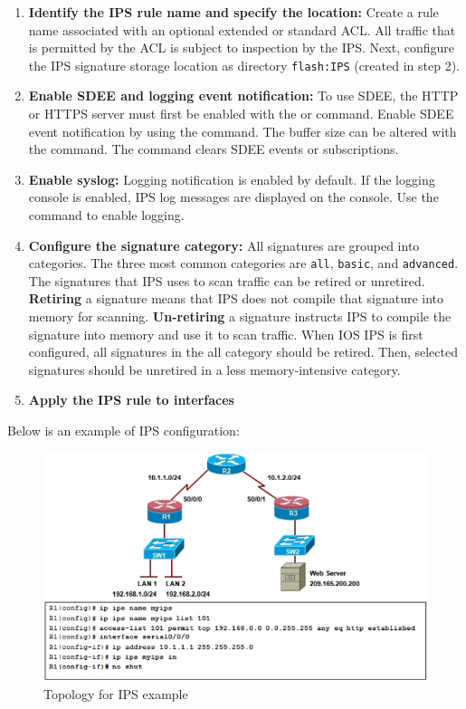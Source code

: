 \begin{enumerate}
\item \textbf{Identify the IPS rule name and specify the location:} Create a rule name associated with an optional extended or standard ACL. All traffic that is permitted by the ACL is subject to inspection by the IPS. Next, configure the IPS signature storage location as directory \verb|flash:IPS| (created in step 2).

\item \textbf{Enable SDEE and logging event notification:} To use SDEE, the HTTP or HTTPS server must first be enabled with the  or  command. Enable SDEE event notification by using the  command. The buffer size can be altered with the  command. The  command clears SDEE events or subscriptions.

\item \textbf{Enable syslog:} Logging notification is enabled by default. If the logging console is enabled, IPS log messages are displayed on the console. Use the  command to enable logging.

\item \textbf{Configure the signature category:} All signatures are grouped into categories. The three most common categories are \verb|all|, \verb|basic|, and \verb|advanced|. The signatures that IPS uses to scan traffic can be retired or unretired. \textbf{Retiring} a signature means that IPS does not compile that signature into memory for scanning. \textbf{Un-retiring} a signature instructs IPS to compile the signature into memory and use it to scan traffic. When IOS IPS is first configured, all signatures in the all category should be retired. Then, selected signatures should be unretired in a less memory-intensive category. 

\item \textbf{Apply the IPS rule to interfaces} 
\end{enumerate}

Below is an example of IPS configuration:

\begin{figure}[hbtp]
\caption{Topology for IPS example}\label{IPSexample}
\centering
\includegraphics[scale=0.7]{pictures/IPSexample.PNG}
\end{figure}

